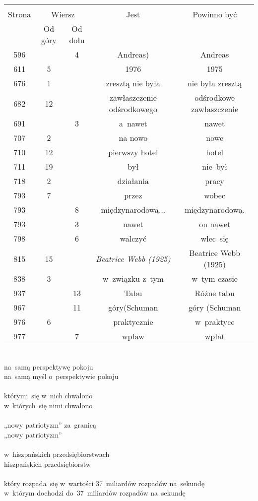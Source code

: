 \documentclass[a4paper,11pt]{article}
\begin{document}
\begin{center}
  \begin{tabular}{|c|c|c|c|c|}
    \hline
    & \multicolumn{2}{c|}{} & & \\
    Strona & \multicolumn{2}{c|}{Wiersz} & Jest
                              & Powinno być \\ \cline{2-3}
    & Od góry & Od dołu & & \\
    \hline
    596 & &  4 & Andreas) & Andreas \\
    611 &  5 & & 1976 & 1975 \\
    676 &  1 & & zresztą nie była & nie była zresztą \\
    682 & 12 & & zawłaszczenie odśrodkowego & odśrodkowe zawłaszczenie \\
    691 & &  3 & a~nawet & nawet \\
    707 &  2 & & na nowo & nowe \\
    710 & 12 & & pierwszy hotel & hotel \\
    711 & 19 & & był & nie~był \\
    718 &  2 & & działania & pracy \\
    793 &  7 & & przez & wobec \\
    793 & &  8 & międzynarodową... & międzynarodową. \\
    793 & &  3 & nawet & on nawet \\
    798 & &  6 & walczyć & wlec~się \\
    815 & 15 & & \emph{Beatrice Webb (1925)} & Beatrice Webb (1925) \\
    838 &  3 & & w~związku z~tym & w~tym czasie \\
    937 & & 13 & Tabu & Różne tabu \\
    967 & & 11 & góry(Schuman & góry (Schuman \\
    976 &  6 & & praktycznie & w~praktyce \\
    977 & &  7 & wpław & wpłat \\
    \hline
  \end{tabular}

\end{center}
\noi
{} \\
\Jest  na~samą perspektywę pokoju \\
\Powin na~samą myśl o~perspektywie pokoju \\
 \\
\Jest  którymi~się w~nich chwalono \\
\Powin w~których~się nimi chwalono \\
 \\
\Jest  „nowy patriotyzm” za~granicą \\
\Powin „nowy patriotyzm” \\
 \\
\Jest  w~hiszpańskich przedsiębiorstwach \\
\Powin hiszpańskich przedsiębiorstw \\
 \\
\Jest  który rozpada~się w~wartości 37~miliardów rozpadów na~sekundę \\
\Powin w~którym dochodzi do~37~miliardów rozpadów na~sekundę \\
\end{document}
